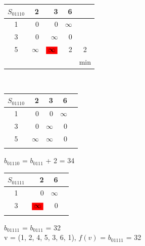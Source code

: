 \documentclass[12pt]{article}
\begin{document}
\begin{flushleft}
\begin{tabular}{c||rrr||c}
$S_{01110}$  &2 & 3 &  6 & \\
\hline
\hline
1 &  0        & 0           & $\infty$ & \\
3 &  0        & $\infty$    & 0 & \\
5 &  $\infty$        & $\colorbox{red}{$\infty$}$           & 2 & 2\\
\hline
\hline
 &  &  &  & min  \\
\end{tabular}
$\qquad $ 
\begin{tabular}{c||rrr||c}
$S_{01110}$  &2 & 3 &  6 & \\
\hline
\hline
1 &  0        & 0           & $\infty$ & \\
3 &  0        & $\infty$    & 0 & \\
5 &  $\infty$        & $\infty$           & 0 &  \\
\hline
\hline
 &  &  & & \\
\end{tabular}
\end{flushleft}

$b_{01110}$ = $b_{0111}$ + 2 = 34\\

\begin{flushleft}
\begin{tabular}{c||rr||c}
$S_{01111}$  &2  &  6 & \\
\hline
\hline
1 &  0                   & $\infty$ & \\
3 &  $\colorbox{red}{$\infty$}$            & 0 & \\
\hline
\hline
 & & & \\
\end{tabular}
\end{flushleft}

$b_{01111}$ = $b_{0111}$  = 32\\


v = (1, 2, 4, 5, 3, 6, 1), $f(v)$ = $b_{01111}$  = 32\\
\end{document}
